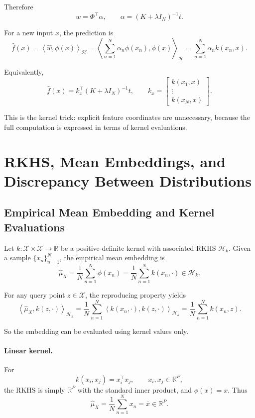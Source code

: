 \documentclass[11pt]{article}
\newcommand{\R}{\mathbb{R}}
\newcommand{\Hspace}{\mathcal{H}}
\newcommand{\inner}[2]{\left\langle #1, #2 \right\rangle}
\newcommand{\transpose}{^{\top}}
\begin{document}
Therefore
\[
\widehat{w} = \Phi\transpose \alpha,
\qquad
\alpha = (K+\lambda I_N)^{-1}t.
\]

For a new input $x$, the prediction is
\[
\widehat{f}(x)
=
\inner{\widehat{w}}{\phi(x)}_{\Hspace}
=
\left\langle \sum_{n=1}^N \alpha_n \phi(x_n), \phi(x) \right\rangle_{\Hspace}
=
\sum_{n=1}^N \alpha_n k(x_n,x).
\]

Equivalently,
\[
\widehat{f}(x)
=
k_x\transpose (K + \lambda I_N)^{-1} t,
\qquad
k_x =
\begin{bmatrix}
k(x_1,x) \\
\vdots \\
k(x_N,x)
\end{bmatrix}.
\]

This is the kernel trick: explicit feature coordinates are unnecessary, because the full computation is expressed in terms of kernel evaluations.

\section{RKHS, Mean Embeddings, and Discrepancy Between Distributions}

\subsection{Empirical Mean Embedding and Kernel Evaluations}

Let $k : \mathcal{X} \times \mathcal{X} \to \R$ be a positive-definite kernel with associated RKHS $\mathcal{H}_k$. Given a sample $\{x_n\}_{n=1}^N$, the empirical mean embedding is
\[
\widehat{\mu}_X
=
\frac{1}{N}\sum_{n=1}^N \phi(x_n)
=
\frac{1}{N}\sum_{n=1}^N k(x_n,\cdot)
\in \mathcal{H}_k.
\]

For any query point $z \in \mathcal{X}$, the reproducing property yields
\[
\inner{\widehat{\mu}_X}{k(z,\cdot)}_{\mathcal{H}_k}
=
\frac{1}{N}\sum_{n=1}^N
\inner{k(x_n,\cdot)}{k(z,\cdot)}_{\mathcal{H}_k}
=
\frac{1}{N}\sum_{n=1}^N k(x_n,z).
\]

So the embedding can be evaluated using kernel values only.

\paragraph{Linear kernel.}
For
\[
k(x_i,x_j) = x_i\transpose x_j,
\qquad
x_i,x_j \in \R^P,
\]
the RKHS is simply $\R^P$ with the standard inner product, and $\phi(x)=x$. Thus
\[
\widehat{\mu}_X
=
\frac{1}{N}\sum_{n=1}^N x_n
=
\bar{x}
\in \R^P.
\]
\end{document}

